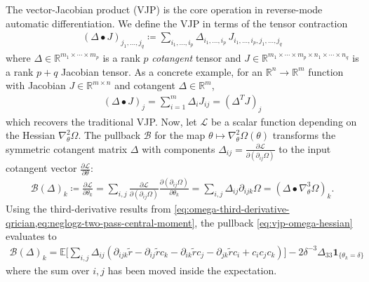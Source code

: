\documentclass{article}
\begin{document}
The vector-Jacobian product (VJP) is the core operation in reverse-mode automatic differentiation.
We define the VJP in terms of the tensor contraction
%
\begin{align}\label{eq:general-bullet-contraction}
  (\Delta \bullet J)_{j_1, \ldots, j_q} \coloneqq \sum_{i_1, \ldots, i_p} \Delta_{i_1, \ldots, i_p} \, J_{i_1, \ldots, i_p, j_1, \ldots, j_q}
\end{align}
%
where $\Delta \in \mathbb{R}^{m_1 \times \cdots \times m_p}$ is a rank $p$ \textit{cotangent} tensor and $J \in \mathbb{R}^{m_1 \times \cdots \times m_p \times n_1 \times \cdots \times n_q}$ is a rank $p+q$ Jacobian tensor.
As a concrete example, for an $\mathbb{R}^n \to \mathbb{R}^m$ function with Jacobian $J \in \mathbb{R}^{m \times n}$ and cotangent $\Delta \in \mathbb{R}^m$,
%
\begin{align}
  (\Delta \bullet J)_j = \sum_{i=1}^m \Delta_i J_{i j} = (\Delta^{T} J)_j
\end{align}
%
which recovers the traditional VJP.
Now, let $\mathcal{L}$ be a scalar function depending on the Hessian $\nabla_\theta^2 \Omega$.
The pullback $\mathcal{B}$ for the map $\theta \mapsto \nabla_\theta^2 \Omega(\theta)$ transforms the symmetric cotangent matrix $\Delta$ with components $\Delta_{ij} = \frac{\partial \mathcal{L}}{\partial (\partial_{ij} \Omega)}$ to the input cotangent vector $\frac{\partial \mathcal{L}}{\partial \theta}$:
%
\begin{align}
  \mathcal{B}(\Delta)_k \coloneqq \frac{\partial \mathcal{L}}{\partial \theta_k} = \sum_{i,j} \frac{\partial \mathcal{L}}{\partial (\partial_{ij} \Omega)} \frac{\partial (\partial_{ij} \Omega)}{\partial \theta_k} = \sum_{i,j} \Delta_{ij} \partial_{ijk} \Omega = (\Delta \bullet \nabla_\theta^3 \Omega)_k. \label{eq:vjp-omega-hessian}
\end{align}
%
Using the third-derivative results from \cref{eq:omega-third-derivative-qrician,eq:neglogz-two-pass-central-moment}, the pullback \cref{eq:vjp-omega-hessian} evaluates to
%
\begin{align}
  \mathcal{B}(\Delta)_k = \mathbb{E} \bigg[ \sum_{i,j} \Delta_{ij} (\partial_{ijk} \tilde{r} - \partial_{ij} \tilde{r} c_k - \partial_{ik} \tilde{r} c_j - \partial_{jk} \tilde{r} c_i + c_i c_j c_k) \bigg] - 2 \delta^{-3} \Delta_{33} \mathbf{1}_{\{\theta_k=\delta\}}
\end{align}
%
where the sum over $i,j$ has been moved inside the expectation.
\end{document}
